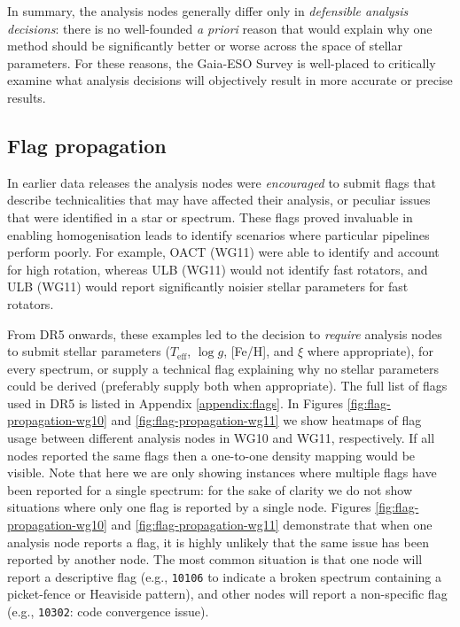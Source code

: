 \documentclass[preprint]{aastex}
\newcommand{\teff}{T_{\mathrm{eff}}}
\newcommand{\logg}{\log g}
\begin{document}
In summary, the analysis nodes generally differ only in \emph{defensible analysis decisions}:
there is no well-founded \emph{a priori} reason that would explain why one method should be
significantly better or worse across the space of stellar parameters.  For these reasons,
the Gaia-ESO Survey is well-placed to critically examine what analysis decisions will
objectively result in more accurate or precise results.


\subsection{Flag propagation}
\label{sec:flag-propagation}

In earlier data releases the analysis nodes were \emph{encouraged} to submit flags that
describe technicalities that may have affected their analysis, or peculiar issues
that were identified in a star or spectrum.  These flags proved invaluable in enabling 
homogenisation leads to identify scenarios where particular pipelines perform poorly. 
For example, OACT (WG11) were able to identify and account for high rotation, whereas 
ULB (WG11) would not identify fast rotators, and ULB (WG11) would report significantly
noisier stellar parameters for fast rotators.


From DR5 onwards, these examples led to the decision to \emph{require} analysis nodes 
to submit stellar parameters ($\teff$, $\logg$, [Fe/H], and $\xi$ where appropriate),
for every spectrum, or supply a technical flag explaining why no stellar parameters
could be derived (preferably supply both when appropriate). The full list of flags used
in DR5 is listed in Appendix \ref{appendix:flags}.  In Figures \ref{fig:flag-propagation-wg10}
and \ref{fig:flag-propagation-wg11} we show heatmaps of flag usage between different 
analysis nodes in WG10 and WG11, respectively.  If all nodes reported the same flags then
a one-to-one density mapping would be visible.  Note that here we are only showing instances
where multiple flags have been reported for a single spectrum: for the sake of clarity we
do not show situations where only one flag is reported by a single node.  Figures 
\ref{fig:flag-propagation-wg10} and \ref{fig:flag-propagation-wg11} demonstrate that when one analysis node reports a flag, it
is highly unlikely that the same issue has been reported by another node. The most common
situation is that one node will report a descriptive flag (e.g., \texttt{10106} 
to indicate a broken spectrum containing a picket-fence or Heaviside pattern), and other
nodes will report a non-specific flag (e.g., \texttt{10302}: code convergence issue).
\end{document}
